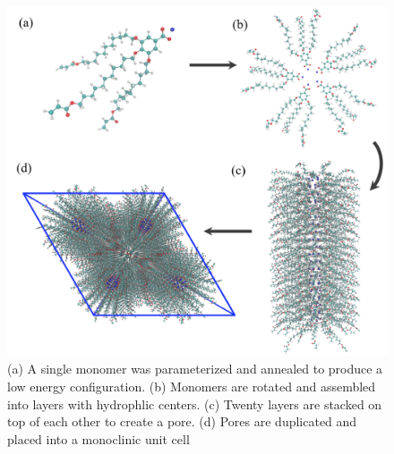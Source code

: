\documentclass{article}
\begin{document}
  \begin{figure}
	\centering
	\includegraphics[width=0.75\linewidth]{build.PNG} %
	\caption{(a) A single monomer was parameterized and annealed to produce a low energy
		configuration. (b) Monomers are rotated and assembled into layers with 
		hydrophlic centers. (c) Twenty layers are stacked on top of each other to create
		a pore. (d) Pores are duplicated and placed into a monoclinic unit cell}\label{fig:python}
  \end{figure}
  
\end{document}
